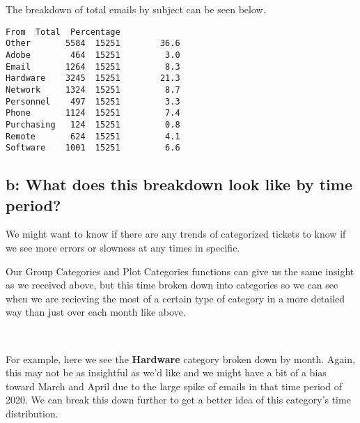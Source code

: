 \documentclass[11pt]{article}
\makeatletter
\newcommand{\boxspacing}{\kern\kvtcb@left@rule\kern\kvtcb@boxsep}
\newcommand{\prompt}[4]{
        \ttfamily\llap{{\color{#2}[#3]:\hspace{3pt}#4}}\vspace{-\baselineskip}
    }
\makeatother
\begin{document}
    The breakdown of total emails by subject can be seen below.

            \begin{tcolorbox}[breakable, size=fbox, boxrule=.5pt, pad at break*=1mm, opacityfill=0]
\prompt{Out}{outcolor}{36}{\boxspacing}
\begin{Verbatim}[commandchars=\\\{\}]
            From  Total  Percentage
Other       5584  15251        36.6
Adobe        464  15251         3.0
Email       1264  15251         8.3
Hardware    3245  15251        21.3
Network     1324  15251         8.7
Personnel    497  15251         3.3
Phone       1124  15251         7.4
Purchasing   124  15251         0.8
Remote       624  15251         4.1
Software    1001  15251         6.6
\end{Verbatim}
\end{tcolorbox}
        
    \hypertarget{b-what-does-this-breakdown-look-like-by-time-period}{%
\subsection{b: What does this breakdown look like by time
period?}\label{b-what-does-this-breakdown-look-like-by-time-period}}

We might want to know if there are any trends of categorized tickets to
know if we see more errors or slowness at any times in specific.

    Our Group Categories and Plot Categories functions can give us the same
insight as we received above, but this time broken down into categories
so we can see when we are recieving the most of a certain type of
category in a more detailed way than just over each month like above.


    \begin{center}
    \end{center}
    { \hspace*{\fill} \\}
    
    For example, here we see the \textbf{Hardware} category broken down by
month. Again, this may not be as insightful as we'd like and we might
have a bit of a bias toward March and April due to the large spike of
emails in that time period of 2020. We can break this down further to
get a better idea of this category's time distribution.

    \begin{center}
    \end{center}
    { \hspace*{\fill} \\}
    
\end{document}
